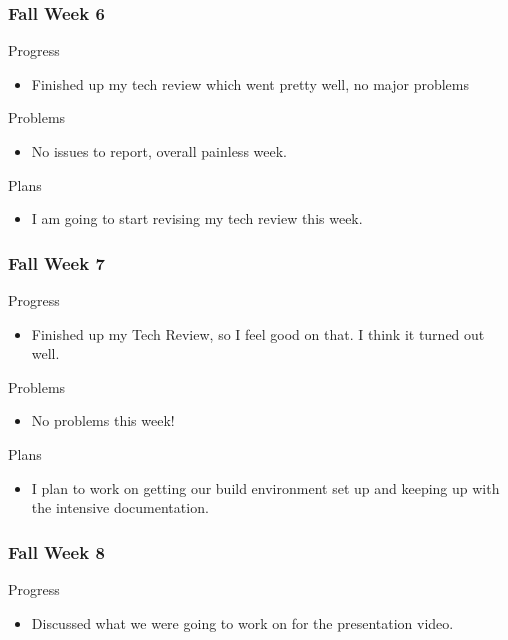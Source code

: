     \subsubsection{Fall Week 6}
        \noindent
        Progress
        \begin{itemize}
            \item
            Finished up my tech review which went pretty well, no major problems
        \end{itemize}
        
        \noindent
        Problems
        \begin{itemize}
            \item
            No issues to report, overall painless week. 
        \end{itemize}
        
        \noindent
        Plans
        \begin{itemize}
            \item
            I am going to start revising my tech review this week. 
        \end{itemize}
    \subsubsection{Fall Week 7}
        \noindent
        Progress
        \begin{itemize}
            \item
            Finished up my Tech Review, so I feel good on that. I think it turned out well.
        \end{itemize}
        
        \noindent
        Problems
        \begin{itemize}
            \item
            No problems this week!
        \end{itemize}
        
        \noindent
        Plans
        \begin{itemize}
            \item
            I plan to work on getting our build environment set up and keeping up with the intensive documentation.
        \end{itemize}
    \subsubsection{Fall Week 8}
        \noindent
        Progress
        \begin{itemize}
            \item Discussed what we were going to work on for the presentation video. 
        \end{itemize}
        
